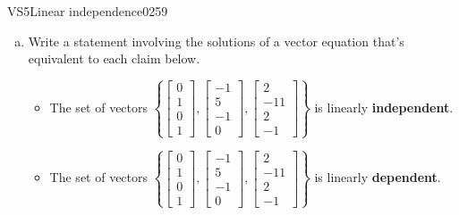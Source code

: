 \begin{exercise}{VS5}{Linear independence}{0259} 
\begin{exerciseStatement} 

\begin{enumerate}[(a)]
\item  

 Write a statement involving the solutions of a vector equation that's equivalent to each claim below. 

 

\begin{itemize}
\item  

 The set of vectors \(\left\{ \left[\begin{array}{c}
0 \\
1 \\
0 \\
1
\end{array}\right] , \left[\begin{array}{c}
-1 \\
5 \\
-1 \\
0
\end{array}\right] , \left[\begin{array}{c}
2 \\
-11 \\
2 \\
-1
\end{array}\right] \right\}\) is linearly \textbf{independent}. 

 
\item  

 The set of vectors \(\left\{ \left[\begin{array}{c}
0 \\
1 \\
0 \\
1
\end{array}\right] , \left[\begin{array}{c}
-1 \\
5 \\
-1 \\
0
\end{array}\right] , \left[\begin{array}{c}
2 \\
-11 \\
2 \\
-1
\end{array}\right] \right\}\) is linearly \textbf{dependent}. 

 
\end{itemize}


\end{enumerate}
\end{exerciseStatement}
\end{exercise}
